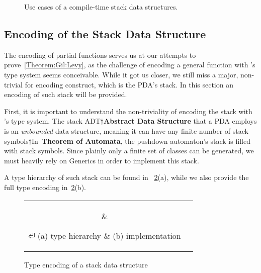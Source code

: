 \begin{figure}[htb]
  \caption{\label{Figure:stack-use-cases}%
    Use cases of a compile-time stack data structures.
  }
\end{figure}

\subsection{Encoding of the Stack Data Structure}
The encoding of partial functions serves us at our attempts to prove~\cref{Theorem:Gil:Levy},
  as the challenge of encoding a general function with \Java's type system seems conceivable.
While it got us closer, we still miss a major, non-trivial for encoding construct, 
  which is the PDA's stack.
In this section an encoding of such stack will be provided.

First, it is important to understand the non-triviality of encoding the stack with \Java's type system.
  The stack ADT†{\textbf{Abstract Data Structure}} that a PDA employs is an \emph{unbounded} data structure,
  meaning it can have any finite number of stack symbols†{In~\textbf{Theorem of Automata}, the pushdown automaton's stack is filled with stack symbols}.
Since plainly only a finite set of \Java classes can be generated, we must heavily rely on \Java Generics in order to
  implement this stack.

A type hierarchy of such stack can be found in ~\cref{Figure:stack:encoding}(a), 
  while we also provide the full \Java type encoding in~\cref{Figure:stack:encoding}(b).
  

\begin{figure}[htb]
  \caption{\label{Figure:stack:encoding} Type encoding of a stack data structure} 
    \begin{tabular}{cc}
      \hspace{-12ex}
      \parbox[c]{0.3\linewidth}{%
        
      }
      &
      \hspace{1ex}
      \parbox[c]{0.86\linewidth}{%
      }
⏎
      \hspace{-12ex} (a) type hierarchy & (b) implementation
    \end{tabular}
\end{figure}
